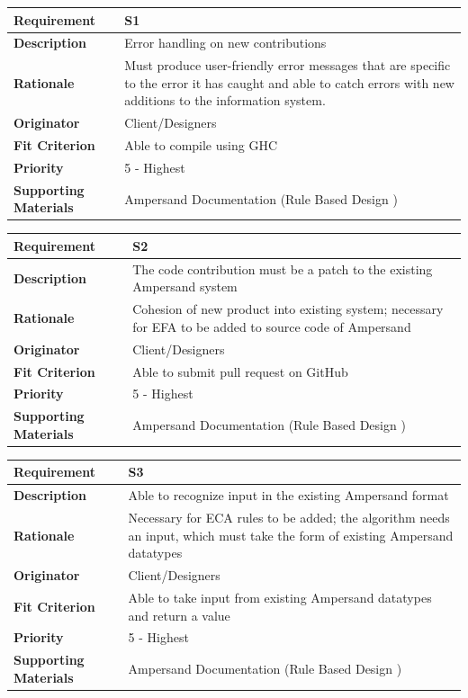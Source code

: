 \documentclass[12pt]{report}
\begin{document}
{\setlength{\tabcolsep}{12pt} %
\begin{tabularx}{\textwidth}{>{\bfseries}C{3cm}X}
Requirement & S1 \\ 
\midrule
\endhead
Description  & Error handling on new contributions  
\\	Rationale & Must produce user-friendly error messages that are specific to 
the error it has caught and able to catch errors with new additions to the 
information system.
\\	Originator & Client/Designers 
\\	Fit Criterion & Able to compile using GHC %
\\	Priority & 5 - Highest
\\	Supporting Materials & Ampersand Documentation (Rule Based Design \cite{RBD}) 
\vspace{12pt}
\end{tabularx}
}%
{\setlength{\tabcolsep}{12pt} %
\begin{tabularx}{\textwidth}{>{\bfseries}C{3cm}X}
Requirement & S2 \\ 
\midrule
\endhead
Description  & The code contribution must be a patch to the existing Ampersand system 
\\	Rationale & Cohesion of new product into existing system; 
                    necessary for EFA to be added to source code of Ampersand 
\\	Originator & Client/Designers 
\\	Fit Criterion & Able to submit pull request on GitHub %
\\	Priority & 5 - Highest
\\	Supporting Materials & Ampersand Documentation (Rule Based Design \cite {RBD}) 
\vspace{12pt}
\end{tabularx}
}%
{\setlength{\tabcolsep}{12pt} %
\begin{tabularx}{\textwidth}{>{\bfseries}C{3cm}X}
Requirement & S3 \\ 
\midrule
\endhead
	Description  & Able to recognize input in the existing Ampersand format
	\\	Rationale & Necessary for ECA rules to be added; the algorithm needs 
  an input, which must take the form of existing Ampersand datatypes 
	\\	Originator & Client/Designers 
	\\	Fit Criterion & Able to take input from existing Ampersand datatypes 
  and return a value
	\\	Priority & 5 - Highest 
	\\	Supporting Materials & Ampersand Documentation (Rule Based Design \cite{RBD}) 
\vspace{12pt}
\end{tabularx}
}%
\end{document}
